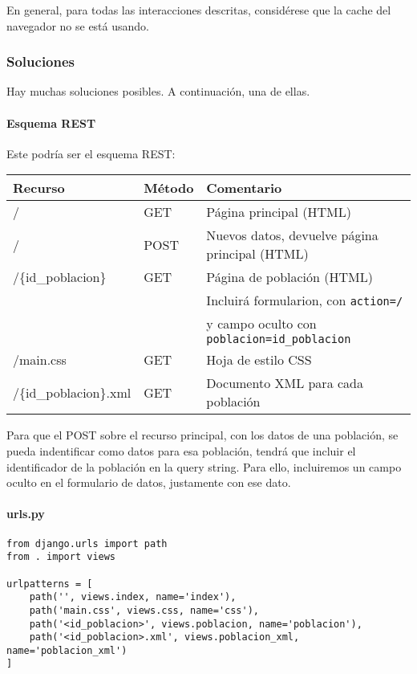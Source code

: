 En general, para todas las interacciones descritas, considérese que la cache del navegador no se está usando.

\subsubsection{Soluciones}

Hay muchas soluciones posibles. A continuación, una de ellas.

\paragraph{Esquema REST}

Este podría ser el esquema REST:

\begin{tabular}{|l|l|l|}
  \hline
  Recurso & Método & Comentario \\ \hline \hline
  /       & GET    & Página principal (HTML) \\
  /       & POST & Nuevos datos, devuelve página principal (HTML) \\ \hline
  /\{id\_poblacion\} & GET & Página de población (HTML) \\
  &     & Incluirá formularion, con \verb|action=/| \\
  &     & y campo oculto con \verb|poblacion=id_poblacion| \\ \hline
  /main.css & GET & Hoja de estilo CSS \\ \hline
  /\{id\_poblacion\}.xml & GET & Documento XML para cada población \\ \hline
\end{tabular}

Para que el POST sobre el recurso principal, con los datos de una población,
se pueda indentificar como datos para esa población, tendrá que incluir
el identificador de la población en la query string. Para ello, incluiremos
un campo oculto en el formulario de datos, justamente con ese dato.

\paragraph{urls.py}


\begin{verbatim}
from django.urls import path
from . import views

urlpatterns = [
    path('', views.index, name='index'),
    path('main.css', views.css, name='css'),
    path('<id_poblacion>', views.poblacion, name='poblacion'),
    path('<id_poblacion>.xml', views.poblacion_xml, name='poblacion_xml')
]
\end{verbatim}


